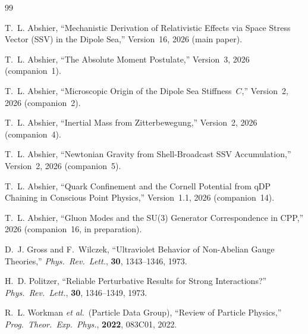 \documentclass[12pt]{article}
\begin{document}
\begin{thebibliography}{99}

T.~L. Abshier,
``Mechanistic Derivation of Relativistic Effects via Space Stress
Vector (SSV) in the Dipole Sea,''
Version~16, 2026 (main paper).

T.~L. Abshier,
``The Absolute Moment Postulate,''
Version~3, 2026 (companion~1).

T.~L. Abshier,
``Microscopic Origin of the Dipole Sea Stiffness~$C$,''
Version~2, 2026 (companion~2).

T.~L. Abshier,
``Inertial Mass from Zitterbewegung,''
Version~2, 2026 (companion~4).

T.~L. Abshier,
``Newtonian Gravity from Shell-Broadcast SSV Accumulation,''
Version~2, 2026 (companion~5).

T.~L. Abshier,
``Quark Confinement and the Cornell Potential from qDP Chaining
in Conscious Point Physics,''
Version~1.1, 2026 (companion~14).

T.~L. Abshier,
``Gluon Modes and the SU(3) Generator Correspondence in CPP,''
2026 (companion~16, in preparation).

D.~J. Gross and F.~Wilczek,
``Ultraviolet Behavior of Non-Abelian Gauge Theories,''
\textit{Phys.\ Rev.\ Lett.}, \textbf{30}, 1343--1346, 1973.

H.~D. Politzer,
``Reliable Perturbative Results for Strong Interactions?''
\textit{Phys.\ Rev.\ Lett.}, \textbf{30}, 1346--1349, 1973.

R.~L. Workman \textit{et al.}\ (Particle Data Group),
``Review of Particle Physics,''
\textit{Prog.\ Theor.\ Exp.\ Phys.}, \textbf{2022}, 083C01, 2022.

\end{thebibliography}
\end{document}
